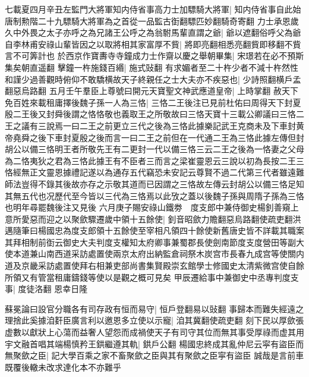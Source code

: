 七載夏四月辛丑左監門大將軍知内侍省事高力士加驃騎大將軍|{
	知内侍省事自此始唐制勲階二十九驃騎大將軍為之首從一品監古衘翻驃匹妙翻騎奇寄翻}
力士承恩歲久中外畏之太子亦呼之為兄諸王公呼之為翁駙馬輩直謂之爺|{
	爺以遮翻俗呼父為爺}
自李林甫安祿山輩皆因之以取將相其家富厚不貲|{
	將即亮翻相悉亮翻貲即移翻不貲言不可筭計也}
於西京作寶夀寺寺鐘成力士作齋以慶之舉朝畢集|{
	宋璟若在必不預斯集矣朝直遥翻}
擊鐘一杵施錢百緡|{
	施式䜴翻}
有求媚者至二十杵少者不減十杵然性和謹少過善觀時俯仰不敢驕横故天子終親任之士大夫亦不疾惡也|{
	少詩照翻横戶孟翻惡烏路翻}
五月壬午羣臣上尊號曰開元天寶聖文神武應道皇帝|{
	上時掌翻}
赦天下免百姓來載租庸擇後魏子孫一人為三恪|{
	三恪二王後注已見前杜佑曰周得天下封夏殷二王後又封舜後謂之恪恪敬也義取王之所敬故曰三恪天寶十三載公卿議曰三恪二王之議有三說焉一曰二王之前更立三代之後為三恪此據樂記武王克商未及下車封黄帝堯舜之後下車封夏殷之後而言一曰二王之前但在一代通二王為三恪此據左傳但封胡公以備三恪明王者所敬先王有二更封一代以備三恪三云二王之後為一恪妻之父母為二恪夷狄之君為三恪此據王有不臣者三而言之梁崔靈恩云三說以初為長按二王三恪經無正文靈恩據禮記遂以為通存五代竊恐未安記云尊賢不過二代第三代者雖遠難師法豈得不錄其後故亦存之示敬其道而已因謂之三恪故左傳云封胡公以備三恪足知其無五代也况歷代至今皆以三代為三恪焉以此攷之蓋以後魏子孫與周隋子孫為三恪也明年尋罷魏後注又見後}
六月庚子賜安祿山鐵劵　度支郎中兼侍御史楊釗善窺上意所愛惡而迎之以聚歛驟遷歲中領十五餘使|{
	釗音昭歛力贍翻惡烏路翻使疏吏翻洪邁隨筆曰楊國忠為度支郎領十五餘使至宰相凡領四十餘使新舊唐史皆不詳載其職案其拜相制前衘云御史大夫判度支權知太府卿事兼蜀郡長使劍南節度支度營田等副大使本道兼山南西道采訪處置使兩京太府出納監倉祠祭木炭宫市長春九成宫等使關内道及京畿采訪處置使拜右相兼吏部尚書集賢殿崇玄館學士修國史太清紫微宫使自餘所領又有管當租庸鑄錢等使以是觀之概可見矣}
甲辰遷給事中兼御史中丞專判度支事|{
	度徒洛翻}
恩幸日隆

蘇冕論曰設官分職各有司存政有恒而易守|{
	恒戶登翻易以䜴翻}
事歸本而難失經遠之理捨此奚據洎姧臣廣言利以邀恩多立使以示寵|{
	洎其冀翻使疏吏翻}
刻下民以厚歛張虚數以獻狀上心蕩而益奢人望怨而成禍使天子有司守其位而無其事受厚祿而虚其用宇文融首唱其端楊慎矜王鉷繼遵其軌|{
	鉷戶公翻}
楊國忠終成其亂仲尼云寜有盜臣而無聚歛之臣|{
	記大學百乘之家不畜聚歛之臣與其有聚歛之臣寜有盜臣}
誠哉是言前車既覆後轍未改求達化本不亦難乎

